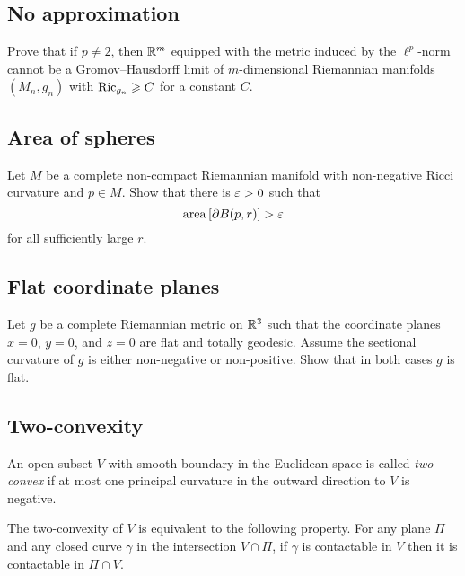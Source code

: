 \subsection*{No approximation\many}
\label{No approximation}

\begin{pr}
Prove that 
if $p\not=2$,
then $\mathbb{R}^m$ 
equipped with the metric induced by the $\ell^p$-norm 
cannot be a
Gromov--Hausdorff limit of
$m$-dimensional Riemannian manifolds $(M_n,g_n)$ with $\Ric_{g_n}\z\ge C$ for a constant $C$.
\end{pr}

\subsection*{Area of spheres}
\label{Area of spheres}

\begin{pr}
Let $M$ be a complete non-compact Riemannian manifold 
with non-negative Ricci curvature and $p\in M$.
Show that there is $\varepsilon>0$ such that 
$$\operatorname{\rm area}\nolimits\left[\partial B(p,r)\right]>\varepsilon$$
for all sufficiently large $r$.
\end{pr}

\subsection*{Flat coordinate planes}
\label{Flat coordinate planes}

\begin{pr}
Let $g$ be a complete Riemannian metric on $\mathbb{R}^3$ such that the coordinate planes $x=0$, $y=0$, and $z=0$ are flat and totally geodesic.
Assume the sectional curvature of $g$ is either non-negative or non-positive.
Show that in both cases $g$ is flat. 
\end{pr}

\subsection*{Two-convexity\many}
\label{Two-convexity}

An open subset $V$ with smooth boundary in the Euclidean space  
is called \emph{two-convex} if at most one principal curvature in the outward direction to $V$ is negative.

The two-convexity of $V$ is equivalent to the following property.
For any plane $\Pi$ and any closed curve $\gamma$ in the intersection  $V\cap \Pi$,
if $\gamma$ is contactable in $V$ then it is contactable in $\Pi\cap V$.

